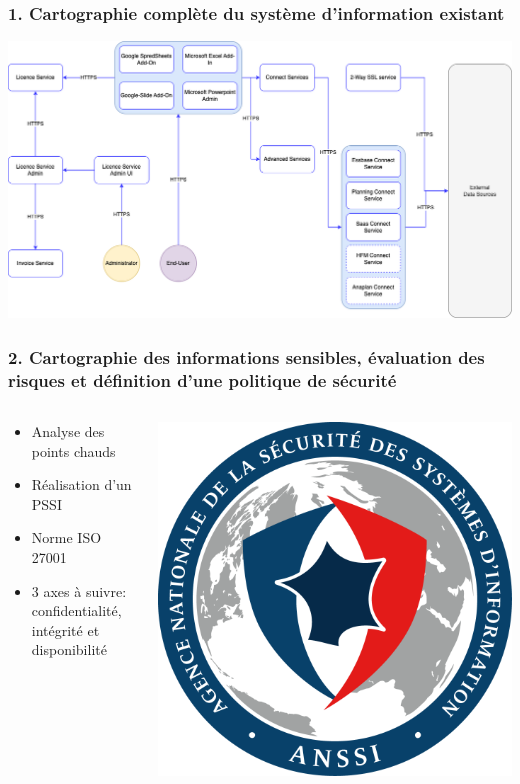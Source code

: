 \documentclass[aspectratio=169]{beamer}
\begin{document}
\begin{frame}
  \frametitle{1. Cartographie complète du système d’information existant}
  \includegraphics[height=0.60\textheight]{Imgs/schema-qibates-original.png}
\end{frame}

\begin{frame}
  \frametitle{2. Cartographie des informations sensibles, 
  évaluation des risques et définition d’une politique de sécurité}
  \begin{columns}
    \begin{column}{0.5\textwidth}
      \begin{itemize}
        \item Analyse des points chauds
        \item Réalisation d'un PSSI
        \item Norme ISO 27001
        \item 3 axes à suivre: confidentialité, intégrité et disponibilité
      \end{itemize}
    \end{column}
    \begin{column}{0.5\textwidth}
      \includegraphics[height=0.50\textheight]{Imgs/anssi.png}
    \end{column}
  \end{columns}
\end{frame}
\end{document}
